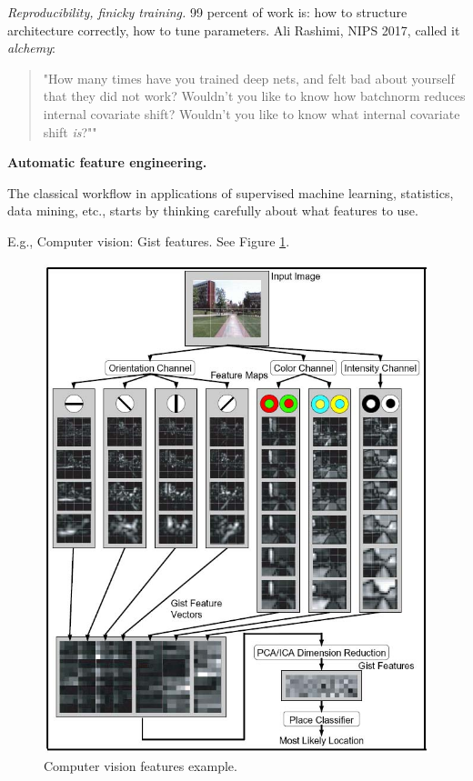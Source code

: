 \documentclass[english]{article}
\begin{document}
\item

\emph{Reproducibility, finicky training.}   99 percent of work is: how to structure architecture correctly, how to tune parameters. Ali Rashimi, NIPS 2017, called it \emph{alchemy}: 

\begin{quote}
"How many times have you trained deep nets, and felt bad about yourself that they did not work? Wouldn't you like to know how batchnorm reduces internal covariate shift? Wouldn't you like to know what internal covariate shift \emph{is}?""
\end{quote}

\eenum


\item {\bf Automatic feature engineering.}

\benum 
\item The classical workflow in applications of supervised machine learning, statistics, data mining, etc., starts by thinking carefully about what features to use. 

E.g., Computer vision: Gist features. See Figure \ref{cv}.

\begin{figure}
  \centering
  \includegraphics[scale=0.3]{Fig_GistExample}
  \caption{Computer vision features example.}
  \label{cv}
\end{figure}
\end{document}
